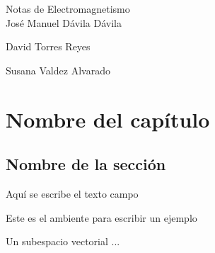 \documentclass[11pt,fleqn]{book} %
\begin{document}
\begingroup
\thispagestyle{empty}
\centering
\vspace*{9cm}
\par\normalfont\fontsize{35}{35}\sffamily\selectfont
Notas de Electromagnetismo\\%
\vspace*{1cm}
{\Huge Jos\'e Manuel D\'avila D\'avila}\par %
\vspace*{1cm}
{\Huge David Torres Reyes}\par %
\vspace*{1cm}
{\Huge Susana Valdez Alvarado}\par %
\endgroup




\pagestyle{empty} %
\tableofcontents %
\cleardoublepage %
\pagestyle{fancy} %
\tableofcontents

\chapter{Nombre del cap\'itulo}

\section{Nombre de la secci\'on}

Aqu\'i se escribe el texto
campo

\begin{example}
 Este es el ambiente para escribir un ejemplo
\end{example}

\begin{definition}
	Un subespacio vectorial ...
\end{definition}
\end{document}
